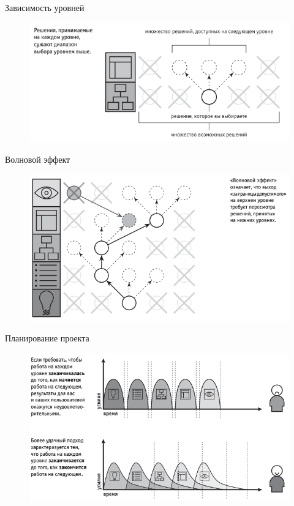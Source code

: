 \documentclass{beamer}
\begin{document}
\begin{frame}{Зависимость уровней}
\begin{figure}[h]
\centering
\includegraphics[scale=0.7]{images/lec01-pic08.png}
\end{figure}
\end{frame}

\begin{frame}{Волновой эффект}
\begin{figure}[h]
\centering
\includegraphics[scale=0.7]{images/lec01-pic09.png}
\end{figure}
\end{frame}

\begin{frame}{Планирование проекта}
\begin{figure}[h]
\centering
\includegraphics[scale=0.7]{images/lec01-pic10.png}
\end{figure}
\end{frame}
\end{document}
